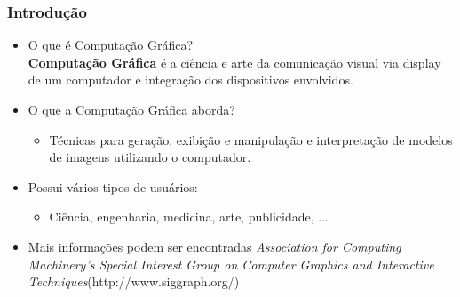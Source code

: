 \documentclass{beamer}
\begin{document}
\begin{frame}
\frametitle{Introdução}

\begin{block}


\begin{itemize}
	
	\item<1-> O que é Computação Gráfica?\\
		\textbf{Computação Gráfica} é a ciência e arte da comunicação visual via display de um computador e integração dos dispositivos envolvidos.
	\item<2-> O que a Computação Gráfica aborda?\\
		\begin{itemize}
			\item<3-> Técnicas para geração, exibição e manipulação e interpretação de modelos de imagens utilizando o computador.
		\end{itemize}
	\item<3-> Possui vários tipos de usuários:
		\begin{itemize}
			\item Ciência, engenharia, medicina, arte, publicidade, ...
		\end{itemize}
	\item<4-> Mais informações podem ser encontradas \textit{Association for Computing Machinery’s Special Interest Group on Computer Graphics and Interactive Techniques}(http://www.siggraph.org/)

\end{itemize}
\end{block}
\end{frame}

\end{document}
